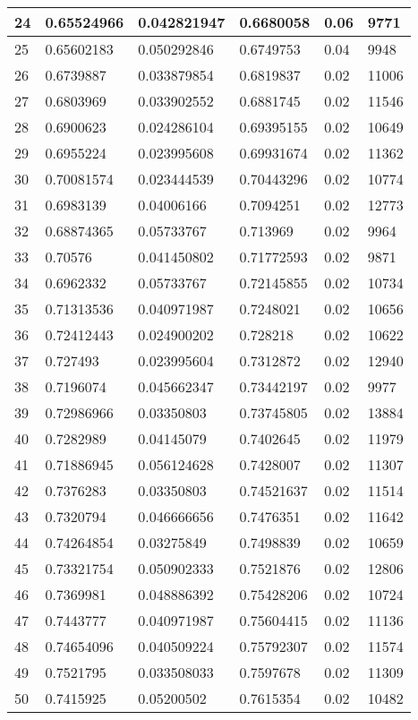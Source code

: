 \begin{longtable}{|l|l|l|l|l|l|}
24 & 0.65524966 & 0.042821947 & 0.6680058 & 0.06 & 9771 \\ \hline 
25 & 0.65602183 & 0.050292846 & 0.6749753 & 0.04 & 9948 \\ \hline 
26 & 0.6739887 & 0.033879854 & 0.6819837 & 0.02 & 11006 \\ \hline 
27 & 0.6803969 & 0.033902552 & 0.6881745 & 0.02 & 11546 \\ \hline 
28 & 0.6900623 & 0.024286104 & 0.69395155 & 0.02 & 10649 \\ \hline 
29 & 0.6955224 & 0.023995608 & 0.69931674 & 0.02 & 11362 \\ \hline 
30 & 0.70081574 & 0.023444539 & 0.70443296 & 0.02 & 10774 \\ \hline 
31 & 0.6983139 & 0.04006166 & 0.7094251 & 0.02 & 12773 \\ \hline 
32 & 0.68874365 & 0.05733767 & 0.713969 & 0.02 & 9964 \\ \hline 
33 & 0.70576 & 0.041450802 & 0.71772593 & 0.02 & 9871 \\ \hline 
34 & 0.6962332 & 0.05733767 & 0.72145855 & 0.02 & 10734 \\ \hline 
35 & 0.71313536 & 0.040971987 & 0.7248021 & 0.02 & 10656 \\ \hline 
36 & 0.72412443 & 0.024900202 & 0.728218 & 0.02 & 10622 \\ \hline 
37 & 0.727493 & 0.023995604 & 0.7312872 & 0.02 & 12940 \\ \hline 
38 & 0.7196074 & 0.045662347 & 0.73442197 & 0.02 & 9977 \\ \hline 
39 & 0.72986966 & 0.03350803 & 0.73745805 & 0.02 & 13884 \\ \hline 
40 & 0.7282989 & 0.04145079 & 0.7402645 & 0.02 & 11979 \\ \hline 
41 & 0.71886945 & 0.056124628 & 0.7428007 & 0.02 & 11307 \\ \hline 
42 & 0.7376283 & 0.03350803 & 0.74521637 & 0.02 & 11514 \\ \hline 
43 & 0.7320794 & 0.046666656 & 0.7476351 & 0.02 & 11642 \\ \hline 
44 & 0.74264854 & 0.03275849 & 0.7498839 & 0.02 & 10659 \\ \hline 
45 & 0.73321754 & 0.050902333 & 0.7521876 & 0.02 & 12806 \\ \hline 
46 & 0.7369981 & 0.048886392 & 0.75428206 & 0.02 & 10724 \\ \hline 
47 & 0.7443777 & 0.040971987 & 0.75604415 & 0.02 & 11136 \\ \hline 
48 & 0.74654096 & 0.040509224 & 0.75792307 & 0.02 & 11574 \\ \hline 
49 & 0.7521795 & 0.033508033 & 0.7597678 & 0.02 & 11309 \\ \hline 
50 & 0.7415925 & 0.05200502 & 0.7615354 & 0.02 & 10482 \\ \hline 
\end{longtable}